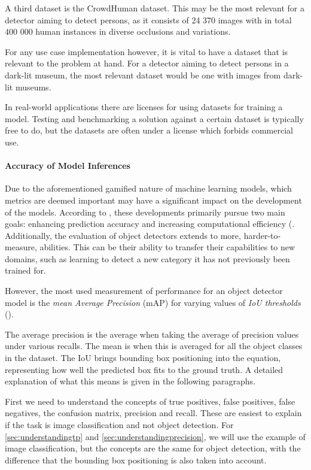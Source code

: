 A third dataset is the CrowdHuman dataset. This may be the most relevant for a detector aiming to detect persons, as it consists of 24 370 images with in total 400 000 human instances in diverse occlusions and variations.

For any use case implementation however, it is vital to have a dataset that is relevant to the problem at hand. For a detector aiming to detect persons in a dark-lit museum, the most relevant dataset would be one with images from dark-lit museums.

In real-world applications there are licenses for using datasets for training a model. Testing and benchmarking a solution against a certain dataset is typically free to do, but the datasets are often under a license which forbids commercial use.

\paragraph{Accuracy of Model Inferences}
\label{sec:accuracy_of_model_inferences}
Due to the aforementioned gamified nature of machine learning models, which metrics are deemed important may have a significant impact on the development of the models. According to \citeauthor{zou2023object_detection_in_20_years}, these developments primarily pursue two main goals: enhancing prediction accuracy and increasing computational efficiency (\citeyear{zou2023object_detection_in_20_years}. Additionally, the evaluation of object detectors extends to more, harder-to-measure, abilities. This can be their ability to transfer their capabilities to new domains, such as learning to detect a new category it has not previously been trained for.

However, the most used measurement of performance for an object detector model is the \textit{mean Average Precision} (mAP) for varying values of \textit{IoU thresholds} (\cite{zou2023object_detection_in_20_years}). 

The average precision is the average when taking the average of precision values under various recalls. The mean is when this is averaged for all the object classes in the dataset. The IoU brings bounding box positioning into the equation, representing how well the predicted box fits to the ground truth. A detailed explanation of what this means is given in the following paragraphs.

First we need to understand the concepts of true positives, false positives, false negatives, the confusion matrix, precision and recall. These are easiest to explain if the task is image classification and not object detection. For \ref{sec:understandingtp} and \ref{sec:understandingprecision}, we will use the example of image classification, but the concepts are the same for object detection, with the difference that the bounding box positioning is also taken into account.

